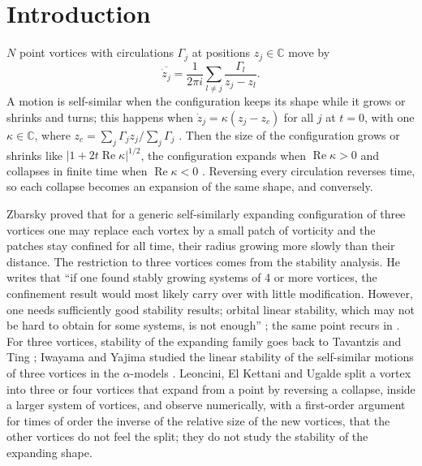 \documentclass[11pt]{article}
\theoremstyle{definition}
\newcommand{\re}{\operatorname{Re}}
\newcommand{\C}{\mathbb{C}}
\begin{document}
\section{Introduction}

$N$ point vortices with circulations $\Gamma_j$ at positions $z_j \in \C$ move by
\begin{equation}\label{eq:bs}
  \overline{\dot z_j} = \frac{1}{2\pi i}\sum_{l \ne j}\frac{\Gamma_l}{z_j - z_l}.
\end{equation}
A motion is self-similar when the configuration keeps its shape while it grows or shrinks and turns; this happens when $\dot z_j = \kappa(z_j - z_c)$ for all $j$ at $t = 0$, with one $\kappa \in \C$, where $z_c = \sum_j\Gamma_jz_j/\sum_j\Gamma_j$ \cite[Sect.~2]{mw2026}. Then the size of the configuration grows or shrinks like $|1 + 2t\re\kappa|^{1/2}$, the configuration expands when $\re\kappa > 0$ and collapses in finite time when $\re\kappa < 0$ \cite{kimura1987, ns1979, aref2010, gotoda2021, ks2022}. Reversing every circulation reverses time, so each collapse becomes an expansion of the same shape, and conversely.

Zbarsky \cite{zbarsky2021} proved that for a generic self-similarly expanding configuration of three vortices one may replace each vortex by a small patch of vorticity and the patches stay confined for all time, their radius growing more slowly than their distance. The restriction to three vortices comes from the stability analysis. He writes that ``if one found stably growing systems of 4 or more vortices, the confinement result would most likely carry over with little modification. However, one needs sufficiently good stability results; orbital linear stability, which may not be hard to obtain for some systems, is not enough'' \cite[pp.~4--5 of the arXiv version]{zbarsky2021}; the same point recurs in \cite[after Cor.~16]{zbarsky2024}. For three vortices, stability of the expanding family goes back to Tavantzis and Ting \cite{tt1988}; Iwayama and Yajima studied the linear stability of the self-similar motions of three vortices in the $\alpha$-models \cite{iy2023}. Leoncini, El Kettani and Ugalde \cite{leu2026} split a vortex into three or four vortices that expand from a point by reversing a collapse, inside a larger system of vortices, and observe numerically, with a first-order argument for times of order the inverse of the relative size of the new vortices, that the other vortices do not feel the split; they do not study the stability of the expanding shape.
\end{document}
